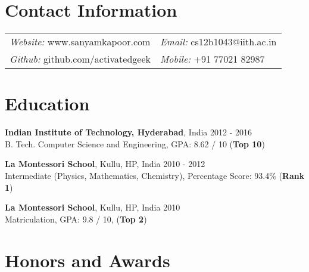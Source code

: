\documentclass[margin,line]{res}
\begin{document}

\begin{resume}

\section{\sc Contact Information}

  \vspace{.05in}

  \begin{tabular}{@{}p{2.9in}p{6in}}
	{\it Website:} www.sanyamkapoor.com & {\it Email:} cs12b1043@iith.ac.in \\
	{\it Github:} github.com/activatedgeek & {\it Mobile:} +91 77021 82987  \\
  \end{tabular}

\begin{comment}
\section{\sc Research Interests}
  Computer Vision and Perception, Object Recognition, Deep Learning
\end{comment}

\section{\sc Education}

  {\bf Indian Institute of Technology, Hyderabad}, India \hfill 2012 - 2016 \\
  	B. Tech. Computer Science and Engineering,
	GPA: 8.62 / 10 ({\bf Top 10})

  \vspace*{-2.5mm}

  {\bf La Montessori School}, Kullu, HP, India \hfill 2010 - 2012 \\
	Intermediate (Physics, Mathematics, Chemistry),
    Percentage Score: 93.4\% ({\bf Rank 1})

  \vspace*{-2.5mm}

  {\bf La Montessori School}, Kullu, HP, India \hfill 2010 \\
	Matriculation,
    GPA: 9.8 / 10, ({\bf Top 2})

\section{\sc Honors and Awards}


\end{resume}
\end{document}
